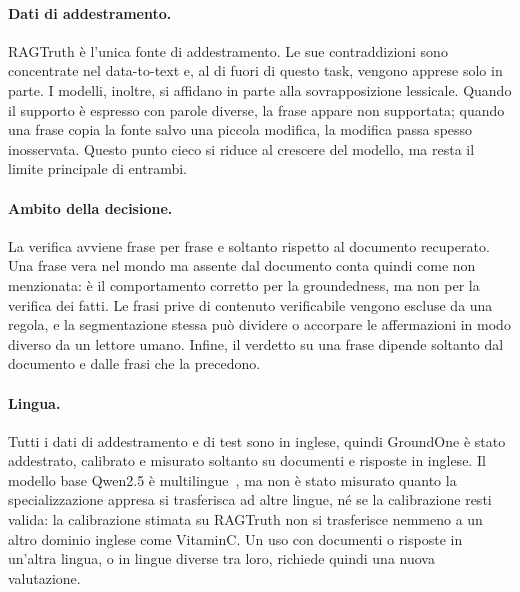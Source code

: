 \paragraph{Dati di addestramento.} RAGTruth è l'unica fonte di addestramento. Le sue contraddizioni sono concentrate nel
data-to-text e, al di fuori di questo task, vengono apprese solo in parte. I modelli, inoltre, si affidano in parte alla
sovrapposizione lessicale. Quando il supporto è espresso con parole diverse, la frase appare non supportata; quando una
frase copia la fonte salvo una piccola modifica, la modifica passa spesso inosservata. Questo punto cieco si riduce al
crescere del modello, ma resta il limite principale di entrambi.

\paragraph{Ambito della decisione.} La verifica avviene frase per frase e soltanto rispetto al documento recuperato. Una
frase vera nel mondo ma assente dal documento conta quindi come non menzionata: è il comportamento corretto per la
groundedness, ma non per la verifica dei fatti. Le frasi prive di contenuto verificabile vengono escluse da una regola, e
la segmentazione stessa può dividere o accorpare le affermazioni in modo diverso da un lettore umano. Infine, il verdetto
su una frase dipende soltanto dal documento e dalle frasi che la precedono.

\paragraph{Lingua.} Tutti i dati di addestramento e di test sono in inglese, quindi GroundOne è stato addestrato,
calibrato e misurato soltanto su documenti e risposte in inglese. Il modello base Qwen2.5 è multilingue~\cite{qwen2024qwen25},
ma non è stato misurato quanto la specializzazione appresa si trasferisca ad altre lingue, né se la calibrazione resti
valida: la calibrazione stimata su RAGTruth non si trasferisce nemmeno a un altro dominio inglese come VitaminC. Un uso
con documenti o risposte in un'altra lingua, o in lingue diverse tra loro, richiede quindi una nuova valutazione.


